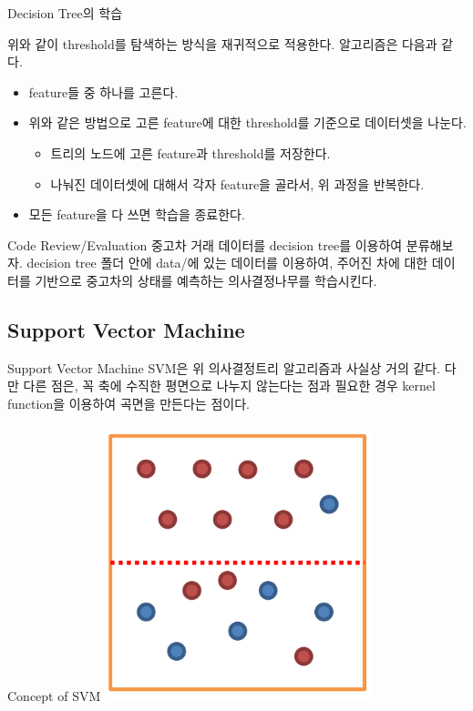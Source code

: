 \documentclass{beamer}
\begin{document}
\begin{frame}{Decision Tree의 학습} 

위와 같이 threshold를 탐색하는 방식을 재귀적으로 적용한다. 알고리즘은 다음과 같다. 

\begin{itemize} 
\item feature들 중 하나를 고른다. 
\item 위와 같은 방법으로 고른 feature에 대한 threshold를 기준으로 데이터셋을 나눈다. 
\begin{itemize} 
\item 트리의 노드에 고른 feature과 threshold를 저장한다. 
\item 나눠진 데이터셋에 대해서 각자 feature을 골라서, 위 과정을 반복한다. 
\end{itemize}
\item 모든 feature을 다 쓰면 학습을 종료한다. 
\end{itemize}

\end{frame}

\begin{frame} {Code Review/Evaluation} 
중고차 거래 데이터를 decision tree를 이용하여 분류해보자. decision tree 폴더 안에 data/에 있는 데이터를 이용하여, 주어진 차에 대한 데이터를 기반으로 중고차의 상태를 예측하는 의사결정나무를 학습시킨다. 
\end{frame}


\subsection{Support Vector Machine} 


\begin{frame}{Support Vector Machine}
SVM은 위 의사결정트리 알고리즘과 사실상 거의 같다. 다만 다른 점은, 꼭 축에 수직한 평면으로 나누지 않는다는 점과 필요한 경우 kernel function을 이용하여 곡면을 만든다는 점이다. 
\end{frame}

\begin{frame}{Concept of SVM}
\includegraphics[height=8cm,keepaspectratio]{entropy}
\end{frame}
\end{document}
